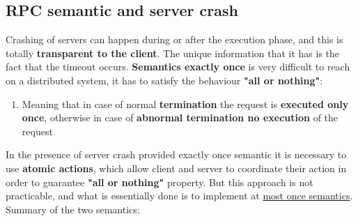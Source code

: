 \subsection{RPC semantic and server crash}
Crashing of servers can happen during or after the execution phase, and this is totally \textbf{transparent to the client}. The unique information that it has is the fact that the timeout occurs. \textbf{Semantics exactly once} is very difficult to reach on a distributed system, it has to satisfy the behaviour \textbf{"all or nothing"}:
\begin{enumerate}
    \item Meaning that in case of normal \textbf{termination} the request is \textbf{executed only once}, otherwise in case of \textbf{abnormal termination no execution} of the request
\end{enumerate}
In the presence of server crash provided exactly once semantic it is necessary to use \textbf{atomic actions}, which allow client and server to coordinate their action in order to guarantee \textbf{"all or nothing"} property. But this approach is not practicable, and what is essentially done is to implement at \underline{most once semantics}.
Summary of the two semantics:
